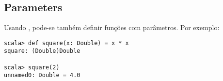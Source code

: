 \begin{itemize}
 


\section{Parameters}

Usando , pode-se também definir funções com parâmetros. Por exemplo:
\begin{lstlisting}
scala> def square(x: Double) = x * x
square: (Double)Double

scala> square(2)
unnamed0: Double = 4.0


\end{lstlisting}
\end{itemize}
